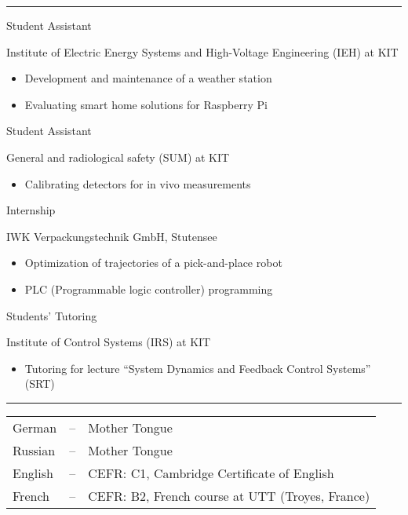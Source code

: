 \documentclass[a4paper,10pt]{article}
\newlength{\cvcolumngapwidth}
\newlength{\cvleftcolumnwidth}
\newlength{\cvrightcolumnwidth}
\newcommand{\cvsectionstyle}[1]{{\normalsize\textcolor{cvsectioncolor}{#1}}}
\newcommand{\cvtitlestyle}[1]{{\large\textcolor{cvtitlecolor}{#1}}}
\newcommand{\cvdurationstyle}[1]{{\small\textcolor{cvdurationcolor}{#1}}}
\newcommand{\cvheadingstyle}[1]{{\normalsize\textcolor{cvheadingcolor}{#1}}}
\newlength{\cvafteritemskipamount}
\newlength{\cvaftersectionskipamount}
\newlength{\cvbetweensectionandheadingextraskipamount}
\newlength{\cvaftertitleskipamount}
\newlength{\cvparskip}
\newcommand{\cvsection}[1]{
    \begin{minipage}[t][][b]{\cvleftcolumnwidth}
        \raggedleft\cvsectionstyle{#1}
    \end{minipage}%
    \hspace{\cvcolumngapwidth}%
    \begin{minipage}[t]{\cvrightcolumnwidth}
        \textcolor{cvrulecolor}{\rule{\cvrightcolumnwidth}{0.3mm}}
    \end{minipage}

    \vspace{\cvaftersectionskipamount}
}
\newcommand{\cvitem}[2]{
    \begin{minipage}[t]{\cvleftcolumnwidth}
    \strut\vspace*{-\baselineskip}\newline %
    \raggedleft #1
    \end{minipage}%
    \hspace{\cvcolumngapwidth}%
    \begin{minipage}[t]{\cvrightcolumnwidth}
        \setlength{\parskip}{\cvparskip}
        \strut\vspace*{-\baselineskip}\newline #2 %
    \end{minipage}

    \vspace{\cvafteritemskipamount}
}
\newcommand{\cvtitle}[1]{
    \cvtitlestyle{#1}

    \vspace{\cvaftertitleskipamount}
    \vspace{-\cvparskip}
}
\begin{document}
\cvsection{WORK EXPERIENCE}

\cvitem{\cvdurationstyle{May 2017 -- now}}{\cvtitle{Student Assistant}
    Institute of Electric Energy Systems and High-Voltage Engineering (IEH) at KIT
    \begin{itemize}[leftmargin=*]
        \item Development and maintenance of a weather station
        \item Evaluating smart home solutions for Raspberry Pi
    \end{itemize}
}

\cvitem{\cvdurationstyle{October 2018 -- December 2019}}{\cvtitle{Student Assistant}
	General and radiological safety (SUM) at KIT
	\begin{itemize}[leftmargin=*]
		\item Calibrating detectors for in vivo measurements
	\end{itemize}
}

\cvitem{\cvdurationstyle{April 2018 -- July 2018}}{\cvtitle{Internship}
    IWK Verpackungstechnik GmbH, Stutensee
    \begin{itemize}[leftmargin=*]
        \item Optimization of trajectories of a pick-and-place robot
        \item PLC (Programmable logic controller) programming
    \end{itemize}
}

\cvitem{\cvdurationstyle{April 2018 -- July 2018}}{\cvtitle{Students' Tutoring}
    Institute of Control Systems (IRS) at KIT
    \begin{itemize}[leftmargin=*]
        \item Tutoring for lecture ``System Dynamics and Feedback Control Systems'' (SRT)
    \end{itemize}
}

\newpage
\cvsection{SKILLS}

\cvitem{\cvheadingstyle{Languages}}{
    \hspace*{-2mm}\begin{tabular}{lcl}
    German  & -- & Mother Tongue \\
    Russian & -- & Mother Tongue \\
    English & -- & CEFR: C1, Cambridge Certificate of English \\
    French & -- & CEFR: B2, French course at UTT (Troyes, France) \\
    \end{tabular}
}
\end{document}
